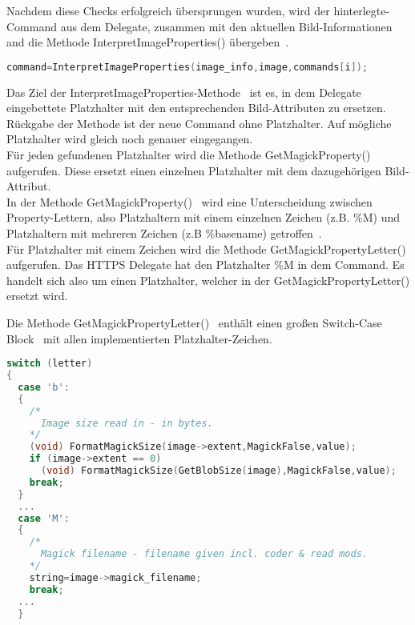 Nachdem diese Checks erfolgreich übersprungen wurden, wird der hinterlegte-Command aus dem Delegate,
zusammen mit den aktuellen Bild-Informationen and die Methode InterpretImageProperties() übergeben~\cite{CallInterpretImageProperties}.

\begin{lstlisting}[firstnumber=1295, language=C, caption=magick/delegates.c InvokeDelegate() InterpretImageProperties() Aufruf,label={lst:delegatesinterpretcall}]
command=InterpretImageProperties(image_info,image,commands[i]);
\end{lstlisting}
\vspace{5mm}

Das Ziel der InterpretImageProperties-Methode~\cite{DeklarationInterpretImageProperties} ist es, in dem Delegate eingebettete Platzhalter mit den entsprechenden Bild-Attributen zu ersetzen.
Rückgabe der Methode ist der neue Command ohne Platzhalter.
Auf mögliche Platzhalter wird gleich noch genauer eingegangen.\\

Für jeden gefundenen Platzhalter wird die Methode GetMagickProperty()~\cite{CallGetMagickPrioerty} aufgerufen.
Diese ersetzt einen einzelnen Platzhalter mit dem dazugehörigen Bild-Attribut.\\

In der Methode GetMagickProperty()~\cite{DeklarationGetMagickProperty} wird eine Unterscheidung zwischen Property-Lettern,
also Platzhaltern mit einem einzelnen Zeichen (z.B. \%M) und Platzhaltern mit mehreren Zeichen (z.B \%basename) getroffen~\cite{UnterscheidungPropertyLetter}.\\

Für Platzhalter mit einem Zeichen wird die Methode GetMagickPropertyLetter() aufgerufen.
Das HTTPS Delegate hat den Platzhalter \%M in dem Command.
Es handelt sich also um einen Platzhalter, welcher in der GetMagickPropertyLetter() ersetzt wird.\\

\newpage

Die Methode GetMagickPropertyLetter()~\cite{DeklarationGetMgickPropertyLetter} enthält einen großen Switch-Case Block~\cite{SwitchBlock} mit allen implementierten Platzhalter-Zeichen.

\begin{lstlisting}[firstnumber = 2358, language=C, caption=magick/property.c GetMagickPropertyLetter Switch über mögliche Platzhalter,label={lst:propertyswitch}]
switch (letter)
{
  case 'b':
  {
    /*
      Image size read in - in bytes.
    */
    (void) FormatMagickSize(image->extent,MagickFalse,value);
    if (image->extent == 0)
      (void) FormatMagickSize(GetBlobSize(image),MagickFalse,value);
    break;
  }
  ...
  case 'M':
  {
    /*
      Magick filename - filename given incl. coder & read mods.
    */
    string=image->magick_filename;
    break;
  ...
  }
\end{lstlisting}
\vspace{5mm}

